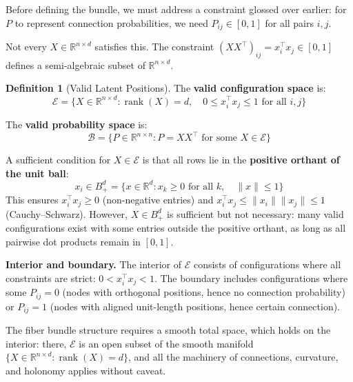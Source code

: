 \documentclass{article}
\newcommand{\RR}{\mathbb{R}}
\DeclareMathOperator{\rank}{rank}
\theoremstyle{plain}
\theoremstyle{definition}
\newtheorem{definition}{Definition}
\theoremstyle{remark}
\begin{document}
Before defining the bundle, we must address a constraint glossed over earlier: for $P$ to represent connection probabilities, we need $P_{ij} \in [0, 1]$ for all pairs $i, j$.

Not every $X \in \RR^{n \times d}$ satisfies this.
The constraint $(XX^\top)_{ij} = x_i^\top x_j \in [0, 1]$ defines a semi-algebraic subset of $\RR^{n \times d}$.

\begin{definition}[Valid Latent Positions]
The \textbf{valid configuration space} is:
\begin{equation}
\mathcal{E} = \{X \in \RR^{n \times d} : \rank(X) = d, \quad 0 \le x_i^\top x_j \le 1 \text{ for all } i, j\}
\end{equation}

The \textbf{valid probability space} is:
\begin{equation}
\mathcal{B} = \{P \in \RR^{n \times n} : P = XX^\top \text{ for some } X \in \mathcal{E}\}
\end{equation}
\end{definition}

A sufficient condition for $X \in \mathcal{E}$ is that all rows lie in the \textbf{positive orthant of the unit ball}:
\begin{equation}
x_i \in B_+^d = \{x \in \RR^d : x_k \ge 0 \text{ for all } k, \quad \|x\| \le 1\}
\end{equation}
This ensures $x_i^\top x_j \ge 0$ (non-negative entries) and $x_i^\top x_j \le \|x_i\| \|x_j\| \le 1$ (Cauchy--Schwarz).
However, $X \in B_+^d$ is sufficient but not necessary: many valid configurations exist with some entries outside the positive orthant, as long as all pairwise dot products remain in $[0,1]$.

\textbf{Interior and boundary.}
The interior of $\mathcal{E}$ consists of configurations where all constraints are strict: $0 < x_i^\top x_j < 1$.
The boundary includes configurations where some $P_{ij} = 0$ (nodes with orthogonal positions, hence no connection probability) or $P_{ij} = 1$ (nodes with aligned unit-length positions, hence certain connection).

The fiber bundle structure requires a smooth total space, which holds on the interior: there, $\mathcal{E}$ is an open subset of the smooth manifold $\{X \in \RR^{n \times d} : \rank(X) = d\}$, and all the machinery of connections, curvature, and holonomy applies without caveat.
\end{document}
